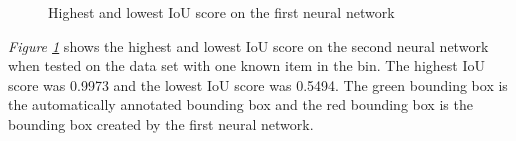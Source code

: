 \begin{figure}[h]
    \centering
    \hspace{0.5cm}
    \caption{Highest and lowest IoU score on the first neural network}
    \label{figure: v1bestworst}
\end{figure}
\textit{Figure \ref{figure: v1bestworst}} shows the highest and lowest IoU score on the second neural network when tested on the data set with one known item in the bin. The highest IoU score was 0.9973 and the lowest IoU score was 0.5494. The green bounding box is the automatically annotated bounding box and the red bounding box is the bounding box created by the first neural network.

\clearpage
